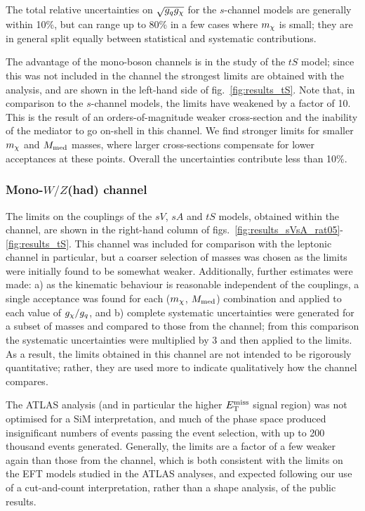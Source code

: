 The total relative uncertainties on $\sqrt{g_q g_{\chi}}$ for the $s$-channel models are generally within 10\%, but can range up to 80\% in a few cases where $m_{\chi}$ is small; they are in general split equally between statistical and systematic contributions.

The advantage of the mono-boson channels is in the study of the $tS$ model; since this was not included in the \monojet channel the strongest limits are obtained with the \monoZ analysis, and are shown in the left-hand side of fig.~\ref{fig:results_tS}. Note that, in comparison to the $s$-channel models, the limits have weakened by a factor of 10. This is the result of an orders-of-magnitude weaker cross-section and the inability of the mediator to go on-shell in this channel. We find stronger limits for smaller $m_{\chi}$ and $M_{\mathrm{med}}$ masses, where larger cross-sections compensate for lower acceptances at these points. Overall the uncertainties contribute less than 10\%.

\subsubsection{Mono-$W/Z$(had) channel}

The limits on the couplings of the $sV$, $sA$ and $tS$ models, obtained within the \monoWZ channel, are shown in the right-hand column of figs.~\ref{fig:results_sVsA_rat05}-\ref{fig:results_tS}. This channel was included for comparison with the leptonic \monoZ channel in particular, but a coarser selection of masses was chosen as the limits were initially found to be somewhat weaker. Additionally, further estimates were made: a) as the kinematic behaviour is reasonable independent of the couplings, a single acceptance was found for each ($m_{\chi}$, $M_{\mathrm{med}}$) combination and applied to each value of $g_{\chi} / g_q$, and b) complete systematic uncertainties were generated for a subset of masses and compared to those from the \monoZ channel; from this comparison the \monoZ systematic uncertainties were multiplied by 3 and then applied to the \monoWZ limits. As a result, the limits obtained in this channel are not intended to be rigorously quantitative; rather, they are used more to indicate qualitatively how the channel compares.

The ATLAS \monoWZ analysis (and in particular the higher $E_{\mathrm{T}}^{\mathrm{miss}}$ signal region) was not optimised for a SiM interpretation, and much of the phase space produced insignificant numbers of events passing the event selection, with up to 200 thousand events generated. Generally, the limits are a factor of a few weaker again than those from the \monoZ channel, which is both consistent with the limits on the EFT models studied in the ATLAS analyses, and expected following our use of a cut-and-count interpretation, rather than a shape analysis, of the \monoWZ public results.

